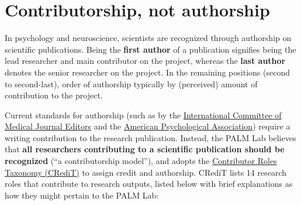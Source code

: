 \documentclass[
]{book}
\begin{document}
\hypertarget{contributorship}{%
\section{Contributorship, not authorship}\label{contributorship}}

In psychology and neuroscience, scientists are recognized through authorship on scientific publications. Being the \textbf{first author} of a publication signifies being the lead researcher and main contributor on the project, whereas the \textbf{last author} denotes the senior researcher on the project. In the remaining positions (second to second-last), order of authorship typically by (perceived) amount of contribution to the project.

Current standards for authorship (such as by the \href{https://www.icmje.org/recommendations/browse/roles-and-responsibilities/defining-the-role-of-authors-and-contributors.html}{International Committee of Medical Journal Editors} and the \href{https://www.apa.org/research/responsible/publication}{American Psychological Association}) require a writing contribution to the research publication. Instead, the PALM Lab believes that \textbf{all researchers contributing to a scientific publication should be recognized} (``a contributorship model''), and adopts the \href{https://credit.niso.org/}{Contributor Roles Taxonomy (CRediT)} to assign credit and authorship. CRediT lists 14 research roles that contribute to research outputs, listed below with brief explanations as how they might pertain to the PALM Lab:
\end{document}
